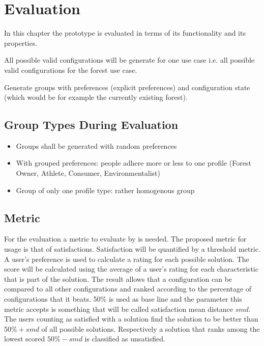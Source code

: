 \chapter{Evaluation}
\label{ch:Evaluation}

In this chapter the prototype is evaluated in terms of its functionality and its properties.

All possible valid configurations will be generate for one use case i.e. all possible valid configurations for the forest use case.

Generate groups with preferences (explicit preferences) and configuration state (which would be for example the currently existing forest).

\section{Group Types During Evaluation}
\label{sec:Evaluation:GroupTypes}

\begin{itemize}
    \item Groups shall be generated with random preferences
    \item With grouped preferences: people adhere more or less to one profile (Forest Owner, Athlete, Consumer, Environmentalist)
    \item Group of only one profile type: rather homogenous group
\end{itemize}

\section{Metric}
\label{sec:Evaluation:Metrics}

For the evaluation a metric to evaluate by is needed. The proposed metric for usage is that of satisfactions. Satisfaction will be quantified by a threshold metric. A user's preference is used to calculate a rating for each possible solution. The score will be calculated using the average of a user's rating for each characteristic that is part of the solution. The result allows that a configuration can be compared to all other configurations and ranked according to the percentage of configurations that it beats. 50\% is used as base line and the parameter this metric accepts is something that will be called satisfaction mean distance $smd$. The users counting as satisfied with a solution find the solution to be better than $50\% + smd$ of all possible solutions. Respectively a solution that ranks among the lowest scored $50\% - smd$ is classified as unsatisfied.

